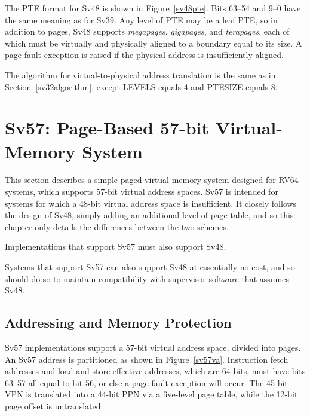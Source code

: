 The PTE format for Sv48 is shown in Figure~\ref{sv48pte}.  Bits 63--54 and 9--0
have the same meaning as for Sv39.  Any level of PTE may be a leaf
PTE, so in addition to  pages, Sv48 supports
 {\em megapages},  {\em gigapages}, and
 {\em terapages}, each of which must be virtually and
physically aligned to a boundary equal to its size.
A page-fault exception is raised if the physical address is insufficiently
aligned.

The algorithm for virtual-to-physical address translation is the same
as in Section~\ref{sv32algorithm}, except LEVELS equals 4 and PTESIZE
equals 8.

\section{Sv57: Page-Based 57-bit Virtual-Memory System}
\label{sec:sv57}

This section describes a simple paged virtual-memory system designed
for RV64 systems, which supports 57-bit virtual address spaces.  Sv57
is intended for systems for which a 48-bit virtual address space is
insufficient.  It closely follows the design of Sv48, simply adding an
additional level of page table, and so this chapter only details the
differences between the two schemes.

Implementations that support Sv57 must also support Sv48.

\begin{commentary}
Systems that support Sv57 can also support Sv48 at essentially no cost, and so
should do so to maintain compatibility with supervisor software that assumes
Sv48.
\end{commentary}

\subsection{Addressing and Memory Protection}

Sv57 implementations support a 57-bit virtual address space, divided
into  pages.  An Sv57 address is partitioned as
shown in Figure~\ref{sv57va}.
Instruction fetch addresses and load and store effective addresses,
which are 64 bits, must have bits 63--57 all equal to bit 56, or else
a page-fault exception will occur.  The 45-bit VPN is translated into a
44-bit PPN via a five-level page table, while the 12-bit page offset
is untranslated.

